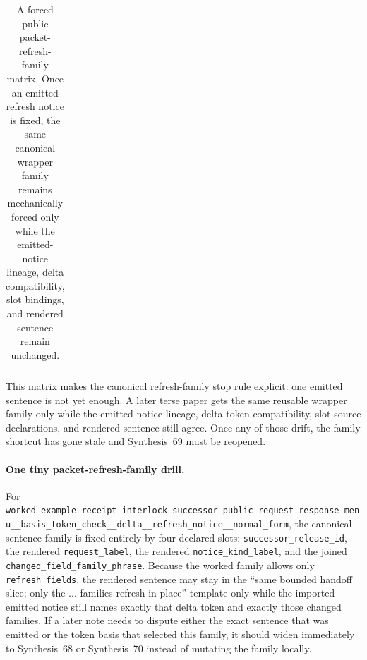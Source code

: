 \documentclass[11pt]{article}
\begin{document}
\begin{table}[t]
\begin{tabularx}{0.97\linewidth}{@{}p{0.31\linewidth}X X@{}}
\bottomrule
\end{tabularx}
\caption{A forced public packet-refresh-family matrix. Once an emitted refresh notice is fixed, the same canonical wrapper family remains mechanically forced only while the emitted-notice lineage, delta compatibility, slot bindings, and rendered sentence remain unchanged.}
\label{tab:forced-public-packet-refresh-family-matrix}
\end{table}

This matrix makes the canonical refresh-family stop rule explicit: one emitted sentence is not yet enough. A later terse paper gets the same reusable wrapper family only while the emitted-notice lineage, delta-token compatibility, slot-source declarations, and rendered sentence still agree. Once any of those drift, the family shortcut has gone stale and Synthesis~69 must be reopened.\cite{series:workedexample}

\paragraph{One tiny packet-refresh-family drill.}
For \nolinkurl{worked_example_receipt_interlock_successor_public_request_response_menu__basis_token_check__delta__refresh_notice__normal_form}, the canonical sentence family is fixed entirely by four declared slots: \nolinkurl{successor_release_id}, the rendered \nolinkurl{request_label}, the rendered \nolinkurl{notice_kind_label}, and the joined \nolinkurl{changed_field_family_phrase}. Because the worked family allows only \nolinkurl{refresh_fields}, the rendered sentence may stay in the ``same bounded handoff slice; only the ... families refresh in place'' template only while the imported emitted notice still names exactly that delta token and exactly those changed families. If a later note needs to dispute either the exact sentence that was emitted or the token basis that selected this family, it should widen immediately to Synthesis~68 or Synthesis~70 instead of mutating the family locally.\cite{series:workedexample}
\end{document}
